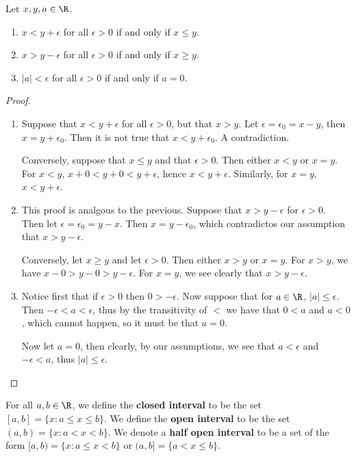 \begin{theorem}
  Let $x,y,a \in \R$.
    \begin{enumerate}[label=(\arabic*)]
      \item $x<y+\epsilon$ for all $\epsilon>0$ if and only if $x \leq y$.

      \item $x>y-\epsilon$ for all $\epsilon>0$ if and only if $x \geq y$.

      \item $|a|<\epsilon$ for all $\epsilon>0$ if and only if $a=0$.
    \end{enumerate}
\end{theorem}
\begin{proof}
  \begin{enumerate}[label=(\arabic*)]
    \item Suppose that $x<y+\epsilon$ for all $\epsilon>0$, but that $x>y$. Let $\epsilon=\epsilon_0=x-y$, then $x=y+\epsilon_0$. 
        Then it is not true that $x<y+\epsilon_0$. A contradiction.

    Conversely, suppose that $x \leq y$ and that $\epsilon>0$. Then either $x<y$ or $x=y$. For $x<y$, $x+0<y+0<y+\epsilon$, 
    hence $x<y+\epsilon$. Similarly, for $x=y$, $x<y+\epsilon$.

    \item This proof is analgous to the previous. Suppose that $x>y-\epsilon$ for $\epsilon>0$. Then let $\epsilon=\epsilon_0=y-x$. 
        Then $x=y-\epsilon_0$, which contradictos our assumption that $x>y-\epsilon$.

    Conversely, let $x \geq y$ and let $\epsilon>0$. Then either $x>y$ or $x=y$. For $x>y$, we have $x-0>y-0>y-\epsilon$. 
    For $x=y$, we see clearly that $x>y-\epsilon$.

    \item Notice first that if $\epsilon>0$ then $0>-\epsilon$. Now suppose that for $a \in \R$, $|a| \leq \epsilon$. Then 
        $-\epsilon<a<\epsilon$, thus by the transitivity of $<$ we have that $0<a$ and $a<0$, which cannot happen, so it must be that $a=0$.

    Now let $a=0$, then clearly, by our assumptions, we see that $a<\epsilon$ and $-\epsilon<a$, thus $|a| \leq \epsilon$.
  \end{enumerate}
\end{proof}

\begin{definition}
  For all $a,b \in \R$, we define the \textbf{closed interval} to be the set $[a,b]=\{x : a \leq x \leq b\}$. We define the 
  \textbf{open interval} to be the set $(a,b)=\{x: a<x<b\}$. We denote a \textbf{half open interval} to be a set of the form $[a,b)=\{x: a \leq x <b\}$ or $(a,b]=\{a <x \leq b\}$.
\end{definition}


